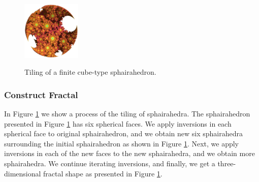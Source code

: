 \begin{figure}[H]
\begin{minipage}[t]{0.19\textwidth}
  \label{fig:sphaira-step10}
 \end{minipage}
 \hspace*{\fill}
 \begin{minipage}[t]{0.19\textwidth}
  \centering
  \includegraphics[width=1.1in, height=1.1in, keepaspectratio]{./img/application/sphairahedron/finiteProcess/final.png}
  \label{fig:sphaira-final}
 \end{minipage}
 \hspace*{\fill}
 \caption{Tiling of a finite cube-type sphairahedron.}
 \label{fig:sphairahedronTile}
\end{figure}

\subsubsection{Construct Fractal}

In Figure \ref{fig:sphairahedronTile} we show a process of the tiling of
sphairahedra.
The sphairahedron presented in Figure
\ref{fig:sphairahedronTile} has six spherical
faces.
We apply inversions in each spherical face to original sphairahedron,
and we obtain new six sphairahedra surrounding the initial sphairahedron
as shown in Figure
\ref{fig:sphairahedronTile}.
Next, we apply inversions in each of the new faces to the new sphairahedra,
and we obtain more sphairahedra.
We continue iterating inversions, and finally, we get a three-dimensional
fractal shape as presented in Figure
\ref{fig:sphairahedronTile}.

